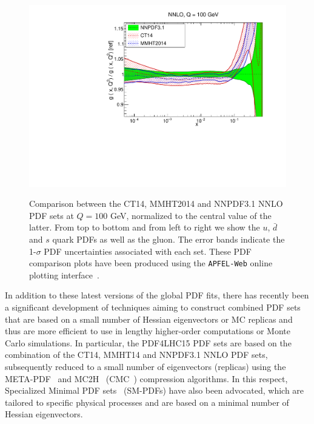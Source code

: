 \begin{figure}[!t]
 \includegraphics[scale=0.37]{plots/xg-31-nnlo-globalfits.pdf}\\
 \caption{\small Comparison between the CT14, MMHT2014
  and NNPDF3.1 NNLO PDF sets at $Q=100$ GeV, normalized
  to the central value of the latter.
  From top to bottom and from left to right we show the
  $u$, $\bar{d}$ and $s$ quark PDFs as well as the gluon.
  The error bands indicate the 1-$\sigma$ PDF uncertainties
  associated with each set.
  These PDF comparison plots have been produced using the
  {\tt APFEL-Web} online plotting interface~\cite{Carrazza:2014gfa}.
    \label{fig:globalfits}
  }
\end{figure}

In addition to these latest versions of the global PDF fits,
there has recently been a significant development of techniques aiming
to construct combined PDF sets that are based on
a small number of Hessian eigenvectors or MC replicas and thus
are more efficient to use in lengthy higher-order
computations or Monte Carlo simulations.
%
In particular, the PDF4LHC15 PDF sets are based on the
combination of the CT14, MMHT14 and NNPDF3.1 NNLO PDF sets,
subsequently reduced to a small number of eigenvectors
(replicas) using the META-PDF~\cite{Gao:2013bia}
and MC2H~\cite{Carrazza:2015aoa}
(CMC~\cite{Carrazza:2015hva}) compression algorithms.
%
In this respect, Specialized Minimal PDF sets~\cite{Carrazza:2016htc}
(SM-PDFs) have also
been advocated, which
are tailored to specific physical processes and are based
on a minimal number of Hessian eigenvectors.
%

